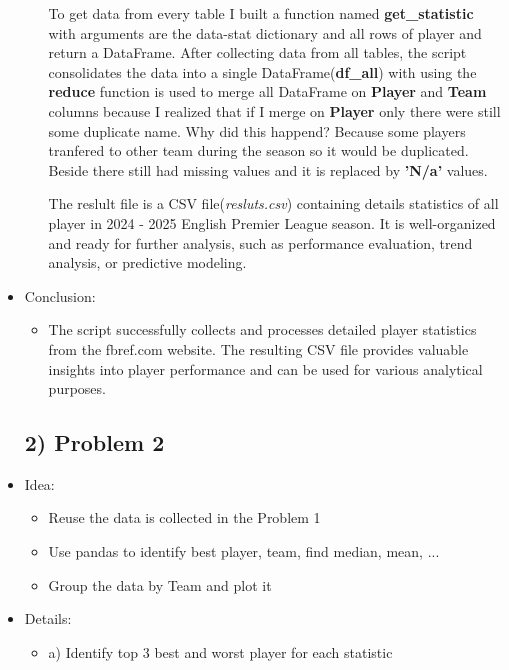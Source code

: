 \documentclass[a4paper,12pt]{article}
\begin{document}
\begin{itemize}[label= {*}, leftmargin= 1cm]
\begin{itemize}[label= {}, leftmargin= 1cm]
        To get data from every table I built a function named \textbf{get\_statistic} with arguments are the data-stat dictionary and all rows of player and return a DataFrame. After collecting data from all tables, the script consolidates the data into a single DataFrame(\textbf{df\_all}) with using the \textbf{reduce} function is used to merge all DataFrame on \textbf{Player} and \textbf{Team} columns because I realized that if I merge on \textbf{Player} only there were still some duplicate name. Why did this happend? Because some players tranfered to other team during the season so it would be duplicated. Beside there still had missing values and it is replaced by \textbf{'N/a'} values.
        \vspace{0.5cm}

        The reslult file is a CSV file(\textit{resluts.csv}) containing details statistics of all player in 2024 - 2025 English Premier League season. It is well-organized and ready for further analysis, such as performance evaluation, trend analysis, or predictive modeling.
        
    \end{itemize}
    \item {\Large Conclusion:}
    \begin{itemize}[label= {}, leftmargin= 1cm]
        \item The script successfully collects and processes detailed player statistics from the fbref.com website. The resulting CSV file provides valuable insights into player performance and can be used for various analytical purposes.
    \end{itemize}
    \newpage

    \subsection*{2) Problem 2}
    \item {\Large Idea:}
    \begin{itemize}[label= {-}, leftmargin= 1cm]
        \item Reuse the data is collected in the Problem 1 
        \item Use pandas to identify best player, team, find median, mean, ...
        \item Group the data by Team and plot it
    \end{itemize}
    \item {\Large Details:}
    \begin{itemize}[label= {}, leftmargin= 1cm]
        \item a) Identify top 3 best and worst player for each statistic
        \vspace{0.5cm}
        

\end{itemize}
\end{itemize}
\end{document}
